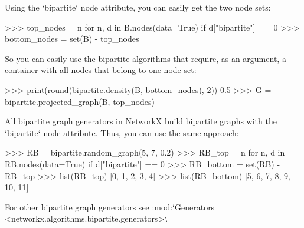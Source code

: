 \begin{DoxyVerb}
Using the `bipartite` node attribute, you can easily get the two node sets:

>>> top_nodes = {n for n, d in B.nodes(data=True) if d["bipartite"] == 0}
>>> bottom_nodes = set(B) - top_nodes

So you can easily use the bipartite algorithms that require, as an argument, a
container with all nodes that belong to one node set:

>>> print(round(bipartite.density(B, bottom_nodes), 2))
0.5
>>> G = bipartite.projected_graph(B, top_nodes)

All bipartite graph generators in NetworkX build bipartite graphs with the
`bipartite` node attribute. Thus, you can use the same approach:

>>> RB = bipartite.random_graph(5, 7, 0.2)
>>> RB_top = {n for n, d in RB.nodes(data=True) if d["bipartite"] == 0}
>>> RB_bottom = set(RB) - RB_top
>>> list(RB_top)
[0, 1, 2, 3, 4]
>>> list(RB_bottom)
[5, 6, 7, 8, 9, 10, 11]

For other bipartite graph generators see
:mod:`Generators <networkx.algorithms.bipartite.generators>`.\end{DoxyVerb}
 